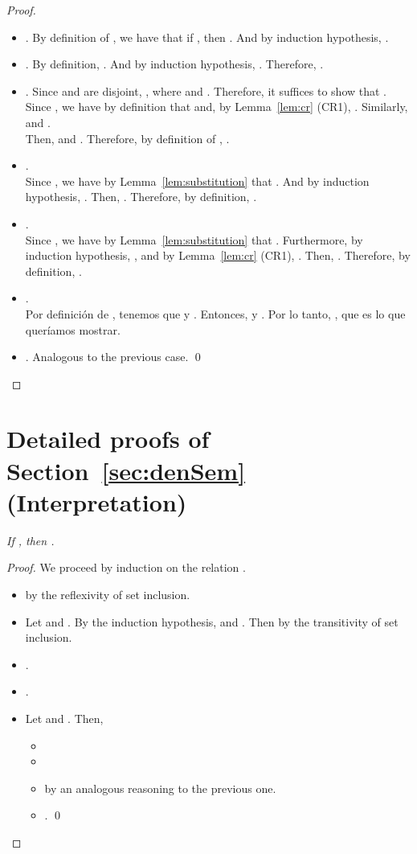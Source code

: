\documentclass[preprint]{elsarticle}
\newcommand\recap[3]{\noindent {\bf #1 \ref{#2}.} \emph{#3}}
\begin{document}
\begin{proof}
\begin{itemize}
  \item . By definition of , we have that if , then . And by induction hypothesis, .

  \item . By definition, . And by induction hypothesis, . Therefore, .

  \item .
    Since  and  are disjoint, , where  and .
    Therefore, it suffices to show that .
    \\ Since , we have by definition that  and, by Lemma~\ref{lem:cr} (CR1), . Similarly,  and .
    \\ Then,  and . Therefore, by definition of , .

  \item .
    \\ Since , we have by Lemma~\ref{lem:substitution} that . And by induction hypothesis, . Then, . Therefore, by definition, .

  \item .
    \\ Since , we have by Lemma~\ref{lem:substitution} that . Furthermore, by induction hypothesis, , and by Lemma~\ref{lem:cr} (CR1), . Then, . Therefore, by definition, .

  \item .
    \\ Por definición de , tenemos que  y . Entonces,  y . Por lo tanto, , que es lo que queríamos mostrar.

  \item .
    Analogous to the previous case. \qed
  \end{itemize}
\end{proof}

\section{Detailed proofs of Section~\ref{sec:denSem} (Interpretation)}\label{ap:denSem}
\recap{Lemma}{lem:inc}{If , then .}
\begin{proof}
  We proceed by induction on the relation .
  \begin{itemize}
  \item  by the reflexivity of set inclusion.
  \item Let  and . By the induction hypothesis,  and . Then  by the transitivity of set inclusion.
  \item .
  \item .
  \item Let  and . Then,
    \begin{itemize}
    \item 
    \item 
    \item  by an analogous reasoning
      to the previous one.
    \item .
      \qed
    \end{itemize}
  \end{itemize}
\end{proof}
\end{document}
